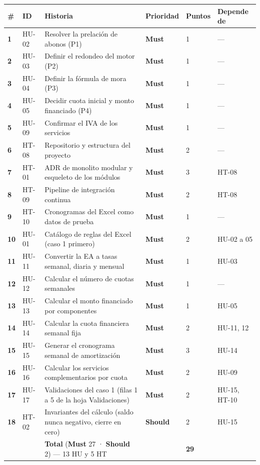 \documentclass[11pt,a4paper]{article}
\newcommand{\must}{\colorbox{alerta}{\color{white}\textbf{\small Must}}}
\newcommand{\should}{\colorbox{primario}{\color{white}\textbf{\small Should}}}
\begin{document}
\begin{longtable}{>{\bfseries}p{0.6cm} p{1.2cm} p{7.4cm} p{1.5cm} p{1.1cm} p{2.2cm}}
\toprule
\# & ID & Historia & Prioridad & Puntos & Depende de \\
\midrule
\endhead
1 & HU-02 & Resolver la prelación de abonos (P1) & \must & 1 & — \\
2 & HU-03 & Definir el redondeo del motor (P2) & \must & 1 & — \\
3 & HU-04 & Definir la fórmula de mora (P3) & \must & 1 & — \\
4 & HU-05 & Decidir cuota inicial y monto financiado (P4) & \must & 1 & — \\
5 & HU-09 & Confirmar el IVA de los servicios & \must & 1 & — \\
6 & HT-08 & Repositorio y estructura del proyecto & \must & 2 & — \\
7 & HT-01 & ADR de monolito modular y esqueleto de los módulos & \must & 3 & HT-08 \\
8 & HT-09 & Pipeline de integración continua & \must & 2 & HT-08 \\
9 & HT-10 & Cronogramas del Excel como datos de prueba & \must & 1 & — \\
10 & HU-01 & Catálogo de reglas del Excel (caso 1 primero) & \must & 2 & HU-02 a 05 \\
11 & HU-11 & Convertir la EA a tasas semanal, diaria y mensual & \must & 1 & HU-03 \\
12 & HU-12 & Calcular el número de cuotas semanales & \must & 1 & — \\
13 & HU-13 & Calcular el monto financiado por componentes & \must & 1 & HU-05 \\
14 & HU-14 & Calcular la cuota financiera semanal fija & \must & 2 & HU-11, 12 \\
15 & HU-15 & Generar el cronograma semanal de amortización & \must & 3 & HU-14 \\
16 & HU-16 & Calcular los servicios complementarios por cuota & \must & 2 & HU-09 \\
17 & HU-17 & Validaciones del caso 1 (filas 1 a 5 de la hoja Validaciones) & \must & 2 & HU-15, HT-10 \\
18 & HT-02 & Invariantes del cálculo (saldo nunca negativo, cierre en cero) & \should & 2 & HU-15 \\
\midrule
 & & \textbf{Total} (\must{} 27 · \should{} 2) — 13 HU y 5 HT & & \textbf{29} & \\
\bottomrule
\end{longtable}
\end{document}
